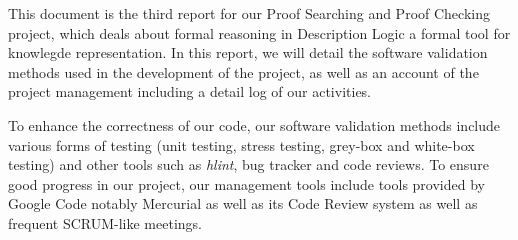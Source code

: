 This document is the third report for our Proof Searching and Proof
Checking project, which deals about formal reasoning in Description
Logic a formal tool for knowlegde representation. In this report, we
will detail the software validation methods used in the development of
the project, as well as an account of the project management including
a detail log of our activities.

To enhance the correctness of our code, our software validation
methods include various forms of testing (unit testing, stress testing,
grey-box and white-box testing) and other tools such
as \emph{hlint}, bug tracker and code reviews. To ensure good
progress in our project, our management tools include tools
provided by Google Code notably Mercurial as well as its Code Review
system as well as frequent SCRUM-like meetings.

